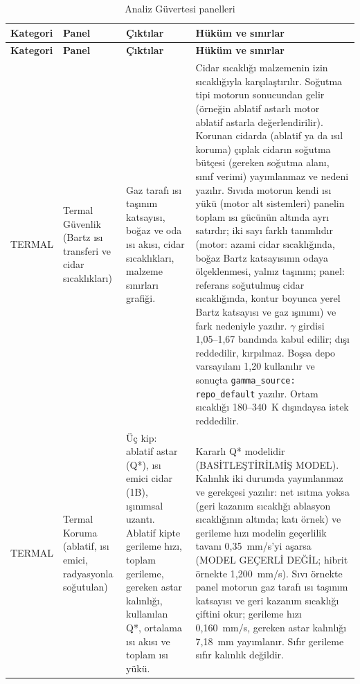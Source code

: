 \documentclass[11pt,a4paper]{article}
\newcommand{\ui}[1]{\textsf{#1}}
\newcommand{\kod}[1]{\texttt{#1}}
\begin{document}
\begin{longtable}{@{}>{\raggedright\arraybackslash}p{3.2cm}>{\raggedright\arraybackslash}p{3.6cm}>{\raggedright\arraybackslash}p{4.2cm}>{\raggedright\arraybackslash}p{4.6cm}@{}}
\caption{Analiz Güvertesi panelleri}\label{tab:paneller}\\
\toprule
\textbf{Kategori} & \textbf{Panel} & \textbf{Çıktılar} & \textbf{Hüküm ve sınırlar} \\
\midrule\endfirsthead
\toprule
\textbf{Kategori} & \textbf{Panel} & \textbf{Çıktılar} & \textbf{Hüküm ve sınırlar} \\
\midrule\endhead
\bottomrule\endlastfoot
\ui{TERMAL} & Termal Güvenlik (Bartz ısı transferi ve cidar sıcaklıkları) & Gaz tarafı ısı taşınım katsayısı, boğaz ve oda ısı akısı, cidar sıcaklıkları, malzeme sınırları grafiği. & Cidar sıcaklığı malzemenin izin sıcaklığıyla karşılaştırılır. Soğutma tipi motorun sonucundan gelir (örneğin ablatif astarlı motor ablatif astarla değerlendirilir). Korunan cidarda (ablatif ya da ısıl koruma) çıplak cidarın soğutma bütçesi (gereken soğutma alanı, sınıf verimi) yayımlanmaz ve nedeni yazılır. Sıvıda motorun kendi ısı yükü (motor alt sistemleri) panelin toplam ısı gücünün altında ayrı satırdır; iki sayı farklı tanımlıdır (motor: azami cidar sıcaklığında, boğaz Bartz katsayısının odaya ölçeklenmesi, yalnız taşınım; panel: referans soğutulmuş cidar sıcaklığında, kontur boyunca yerel Bartz katsayısı ve gaz ışınımı) ve fark nedeniyle yazılır. $\gamma$ girdisi 1,05--1,67 bandında kabul edilir; dışı reddedilir, kırpılmaz. Boşsa depo varsayılanı 1,20 kullanılır ve sonuçta \kod{gamma\_\allowbreak{}source: repo\_\allowbreak{}default} yazılır. Ortam sıcaklığı 180--340~K dışındaysa istek reddedilir. \\
\ui{TERMAL} & Termal Koruma (ablatif, ısı emici, radyasyonla soğutulan) & Üç kip: ablatif astar (Q*), ısı emici cidar (1B), ışınımsal uzantı. Ablatif kipte gerileme hızı, toplam gerileme, gereken astar kalınlığı, kullanılan Q*, ortalama ısı akısı ve toplam ısı yükü. & Kararlı Q* modelidir (\ui{BASİTLEŞTİRİLMİŞ MODEL}). Kalınlık iki durumda yayımlanmaz ve gerekçesi yazılır: net ısıtma yoksa (geri kazanım sıcaklığı ablasyon sıcaklığının altında; katı örnek) ve gerileme hızı modelin geçerlilik tavanı 0,35~mm/s'yi aşarsa (\ui{MODEL GEÇERLİ DEĞİL}; hibrit örnekte 1,200~mm/s). Sıvı örnekte panel motorun gaz tarafı ısı taşınım katsayısı ve geri kazanım sıcaklığı çiftini okur; gerileme hızı 0,160~mm/s, gereken astar kalınlığı 7,18~mm yayımlanır. Sıfır gerileme sıfır kalınlık değildir. \\

\end{longtable}
\end{document}
